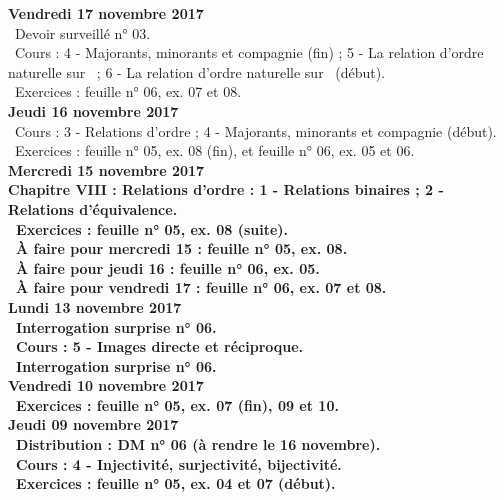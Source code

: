 \documentclass[12pt,a4paper]{article}
\begin{document}
\noindent\textbf{Vendredi 17 novembre 2017}\\
\bu\ Devoir surveillé n° 03.\\
 \bu\ Cours : 4 - Majorants, minorants et compagnie (fin) ; 5 - La relation d'ordre naturelle sur \N\ ; 
 6 - La relation d'ordre naturelle sur \R\ (début).\\
\bu\ Exercices : feuille n° 06, ex. 07 et 08.\vspace{.4cm}\\

\noindent\textbf{Jeudi 16 novembre 2017}\\
 \bu\ Cours : 3 - Relations d'ordre ;  4 - Majorants, minorants et compagnie (début).\\
\bu\ Exercices : feuille n° 05, ex. 08 (fin), et feuille n° 06, ex. 05 et 06.\vspace{.4cm}\\

\noindent\textbf{\bf Mercredi 15 novembre 2017}\\
\bf Chapitre VIII \rm : Relations d'ordre : 1 - Relations binaires ; 2 - Relations d'équivalence.\\
\bu\ Exercices : feuille n° 05, ex. 08 (suite).\\
\bu\ À faire pour mercredi 15 : feuille n° 05, ex. 08.\\
\bu\ À faire pour jeudi 16 : feuille n° 06, ex. 05.\\
\bu\ À faire pour vendredi 17 : feuille n° 06, ex. 07 et 08.\vspace{.4cm}\\

\noindent\textbf{Lundi 13 novembre 2017}\\
\bu\ Interrogation surprise n° 06.\\
\bu\ Cours : 5 - Images directe et réciproque.\\
\bu\ Interrogation surprise n° 06.\\

\noindent\textbf{Vendredi 10 novembre 2017}\\
\bu\ Exercices : feuille n° 05, ex. 07 (fin), 09 et 10.\vspace{.4cm}\\
 
\noindent\textbf{Jeudi 09 novembre 2017}\\
\bu\ Distribution : DM n° 06 (à rendre le 16 novembre).\\
\bu\ Cours : 4 - Injectivité, surjectivité, bijectivité.\\
\bu\ Exercices : feuille n° 05, ex. 04 et 07 (début).\vspace{.4cm}\\
\end{document}
